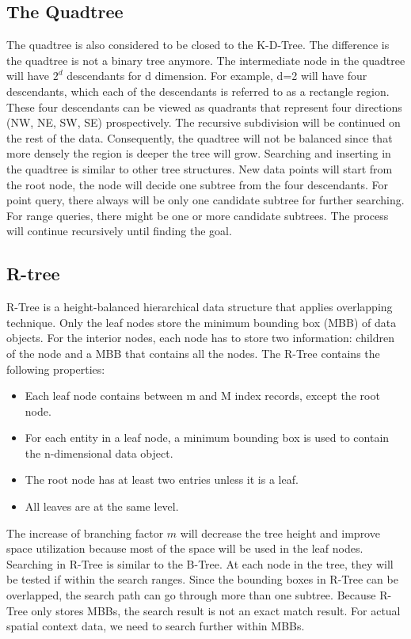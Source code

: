 \subsection{The Quadtree}
The quadtree \cite{CSUR:tm} is also considered to be closed to the K-D-Tree. The difference is the quadtree is not a binary tree anymore. The intermediate node in the quadtree will have ${2^d}$ descendants for d dimension. For example, d=2 will have four descendants, which each of the descendants is referred to as a rectangle region. These four descendants can be viewed as quadrants that represent four directions (NW, NE, SW, SE) prospectively. The recursive subdivision will be continued on the rest of the data. Consequently, the quadtree will not be balanced since that more densely the region is deeper the tree will grow. 
Searching and inserting in the quadtree is similar to other tree structures. New data points will start from the root node, the node will decide one subtree from the four descendants. For point query, there always will be only one candidate subtree for further searching. For range queries, there might be one or more candidate subtrees. The process will continue recursively until finding the goal.


\subsection{R-tree}
R-Tree\cite{Guttman:1984ka} is a height-balanced hierarchical data structure that applies overlapping technique. Only the leaf nodes store the minimum bounding box (MBB) of data objects. For the interior nodes, each node has to store two information: children of the node and a MBB that contains all the nodes. The R-Tree contains the following properties: 

\begin{itemize}
  \item Each leaf node contains between m and M index records, except the root node. 
  \item For each entity in a leaf node, a minimum bounding box is used to contain the n-dimensional data object.
  \item The root node has at least two entries unless it is a leaf.
  \item All leaves are at the same level.
\end{itemize}


The increase of branching factor ${m}$ will decrease the tree height and improve space utilization because most of the space will be used in the leaf nodes. Searching in R-Tree is similar to the B-Tree. At each node in the tree, they will be tested if within the search ranges. Since the bounding boxes in R-Tree can be overlapped, the search path can go through more than one subtree. Because R-Tree only stores MBBs, the search result is not an exact match result. For actual spatial context data, we need to search further within MBBs.


